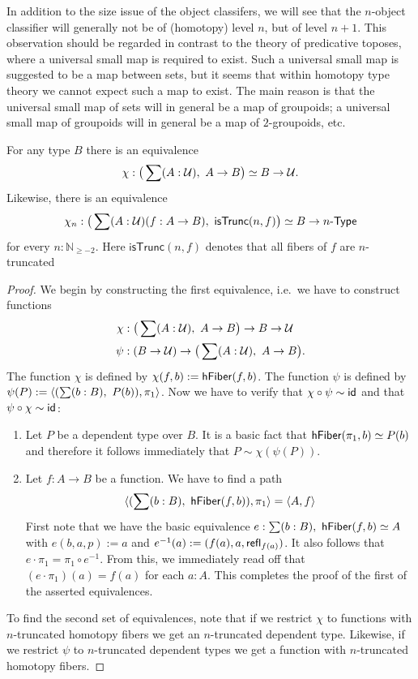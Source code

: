In addition to the size issue of the object classifers, we will see that the
$n$-object classifier will generally not be of (homotopy) level $n$, but of level
$n+1$. This observation should be regarded in contrast to the theory of 
predicative toposes, where a universal small
map is required to exist. Such a universal small map is suggested to be a map
between sets, 
but it seems that within homotopy type theory we cannot expect
such a map to exist. The main reason is that the universal small map of sets
will in general be a map of groupoids; a universal small map of groupoids will
in general be a map of $2$-groupoids, etc.

\begin{thm}\label{thm:nobject_classifier_appetizer}
For any type $B$ there is an equivalence
\begin{equation*}
\chi:\big(\sum(A:\mathcal{U}),\ A\to B\big)\simeq B\to\mathcal{U}.
\end{equation*}
Likewise, there is an equivalence
\begin{equation*}
\chi_n:\big(\sum(A:\type)(f:A\to B),\ \mathsf{isTrunc}(n,f)\big)\simeq B\to \typele{n}
\end{equation*}
for every $n:\mathbb{N}_{\geq-2}$. Here $\mathsf{isTrunc}(n,f)$ denotes that all fibers of $f$ are $n$-truncated
\end{thm}

\begin{proof}
We begin by constructing the first equivalence, i.e.\ we have to construct functions
\begin{align*}
\chi & : \big(\sum(A:\mathcal{U}),\ A\to B\big)\to B\to\mathcal{U}\\
\psi & : (B\to\mathcal{U})\to\big(\sum(A:\mathcal{U}),\ A\to B\big).
\end{align*}
The function $\chi$ is defined by $\chi(f,b):=\mathsf{hFiber}(f,b)$. The
function $\psi$ is defined by $\psi(P):=\pairr{(\sum(b:B),\ P(b)),\pi_1}$. Now
we have to verify that $\chi\circ\psi\sim\mathsf{id}_{}{}$ and that $\psi\circ\chi
\sim\mathsf{id}_{}{}$:
\begin{enumerate}
\item Let $P$ be a dependent type over $B$. It is a basic fact that 
$\mathsf{hFiber}(\pi_1,b)\simeq P(b)$ and therefore it follows immediately
that $P\sim\chi(\psi(P))$.
\item Let $f:A\to B$ be a function. We have to find a path
\begin{equation*}
\pairr{(\sum(b:B),\ \hfiber{f}b),\pi_1}=\pairr{A,f}
\end{equation*}
First note that we have the basic equivalence
$e:\sum(b:B),\ \hfiber{f}b\simeq A$ with $e(b,a,p):=a$ and $e^{-1}(a)
:=(f(a),a,\mathsf{refl}_{f(a)})$. It also follows that
$e\cdot\pi_1=\pi_1\circ e^{-1}$. From this, we immediately read off
that $(e\cdot\pi_1)(a)= f(a)$ for each $a:A$. This completes the proof
of the first of the asserted equivalences.
\end{enumerate}
To find the second set of equivalences, note that if we restrict $\chi$ to
functions with $n$-truncated homotopy fibers we get an $n$-truncated dependent
type. Likewise, if we restrict $\psi$ to $n$-truncated dependent types we get
a function with $n$-truncated homotopy fibers.
\end{proof}

